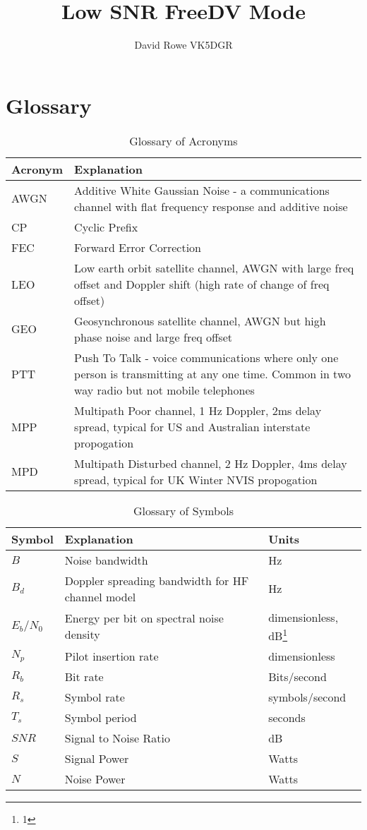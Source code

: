 \documentclass{article}
\begin{document}
\title{Low SNR FreeDV Mode}
\author{David Rowe VK5DGR}
\maketitle

\section{Glossary}

\begin{table}[h]
\centering
\begin{tabular}{l p{8cm} }
 \hline
 Acronym & Explanation \\
 \hline
 AWGN & Additive White Gaussian Noise - a communications channel with flat frequency response and additive noise \\
 CP & Cyclic Prefix \\
 FEC & Forward Error Correction \\
 LEO & Low earth orbit satellite channel, AWGN with large freq offset and Doppler shift (high rate of change of freq offset) \\
 GEO & Geosynchronous satellite channel, AWGN but high phase noise and large freq offset \\
 PTT & Push To Talk - voice communications where only one person is transmitting at any one time.  Common in two way radio but not mobile telephones  \\
 MPP & Multipath Poor channel, 1 Hz Doppler, 2ms delay spread, typical for US and Australian interstate propogation \\
 MPD & Multipath Disturbed channel, 2 Hz Doppler, 4ms delay spread, typical for UK Winter NVIS propogation \\
 \hline
\end{tabular}
\caption{Glossary of Acronyms}
\end{table}

\begin{table}[h]
\centering
\begin{tabular}{l l l}
 \hline
 Symbol & Explanation & Units \\
 \hline
 $B$ & Noise bandwidth & Hz \\
 $B_d$ & Doppler spreading bandwidth for HF channel model & Hz \\
 $E_b/N_0$ & Energy per bit on spectral noise density & dimensionless, dB\footnote{1} \\
 $N_p$ & Pilot insertion rate & dimensionless \\
 $R_b$ & Bit rate & Bits/second \\
 $R_s$ & Symbol rate & symbols/second \\
 $T_s$ & Symbol period & seconds \\
 $SNR$ & Signal to Noise Ratio & dB \\
 $S$ & Signal Power & Watts \\
 $N$ & Noise Power & Watts \\
 \hline
\end{tabular}
\caption{Glossary of Symbols}
\end{table}
\end{document}
